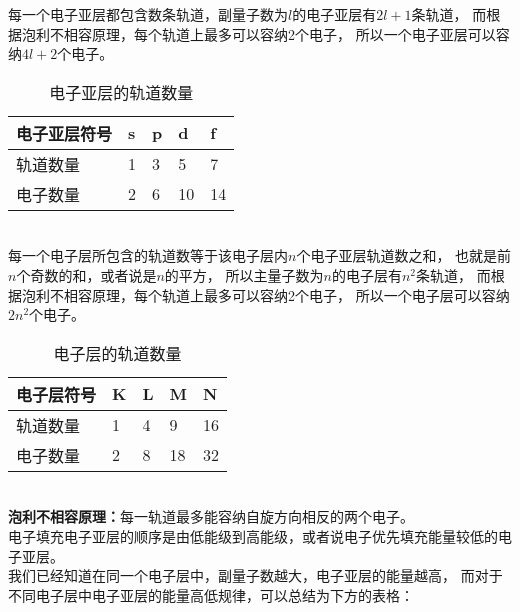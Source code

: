 \documentclass[UTF8]{ctexart}
\begin{document}
\newpage

    每一个电子亚层都包含数条轨道，副量子数为$l$的电子亚层有$2l+1$条轨道，
    而根据泡利不相容原理，每个轨道上最多可以容纳2个电子，
    所以一个电子亚层可以容纳$4l+2$个电子。\vspace{5pt}
    \begin{table}[h]
        \begin{center}
            \begin{tabular}{l|l|l|l|l}
                \hline
                电子亚层符号\qquad\qquad&s\qquad\qquad&p\qquad\qquad&d\qquad\qquad&f\qquad\qquad\\ \hline
                轨道数量&1&3&5&7\\ \hline
                电子数量&2&6&10&14\\ \hline
            \end{tabular}
            \caption{电子亚层的轨道数量}
        \end{center}
    \end{table}\\
    每一个电子层所包含的轨道数等于该电子层内$n$个电子亚层轨道数之和，
    也就是前$n$个奇数的和，或者说是$n$的平方，
    所以主量子数为$n$的电子层有$n^2$条轨道，
    而根据泡利不相容原理，每个轨道上最多可以容纳2个电子，
    所以一个电子层可以容纳$2n^2$个电子。\vspace{5pt}
    \begin{table}[h]
        \begin{center}
            \begin{tabular}{l|l|l|l|l}
                \hline
                电子层符号\qquad\qquad&K\qquad\qquad&L\qquad\qquad&M\qquad\qquad&N\qquad\qquad\\ \hline
                轨道数量&1&4&9&16\\ \hline
                电子数量&2&8&18&32\\ \hline
            \end{tabular}
            \caption{电子层的轨道数量}
        \end{center}
    \end{table}\\
    \textbf{泡利不相容原理：}每一轨道最多能容纳自旋方向相反的两个电子。\\[6mm]
    电子填充电子亚层的顺序是由低能级到高能级，或者说电子优先填充能量较低的电子亚层。\\[3mm]
    我们已经知道在同一个电子层中，副量子数越大，电子亚层的能量越高，
    而对于不同电子层中电子亚层的能量高低规律，可以总结为下方的表格：\vspace{5pt}
\end{document}
